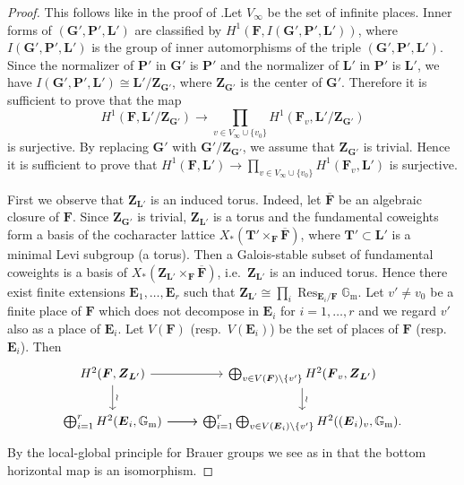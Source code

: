 \documentclass[a4paper]{amsart}
\numberwithin{equation}{section}
\theoremstyle{remark}
\theoremstyle{definition}
\DeclareMathOperator{\Res}{Res}
\newcommand{\glob}[1]{\boldsymbol{#1}}
\renewcommand{\simeq}{\cong}
\begin{document}
\begin{proof}
This follows like in the proof of \cite[Lemma~3.2]{MR3861809}.Let $V_{\infty}$ be the set of infinite places.
Inner forms of $(\glob{G}',\glob{P}',\glob{L}')$ are classified by $H^{1}(\glob{F},I(\glob{G}',\glob{P}',\glob{L}'))$, where $I(\glob{G}',\glob{P}',\glob{L}')$ is the group of inner automorphisms of the triple $(\glob{G}',\glob{P}',\glob{L}')$.
Since the normalizer of $\glob{P}'$ in $\glob{G}'$ is $\glob{P}'$ and the normalizer of $\glob{L}'$ in $\glob{P}'$ is $\glob{L}'$, we have $I(\glob{G}',\glob{P}',\glob{L}')\simeq \glob{L}'/\glob{Z}_{\glob{G}'}$, where $\glob{Z}_{\glob{G}'}$ is the center of $\glob{G}'$.
Therefore it is sufficient to prove that the map
\begin{equation}\label{eq:Galois cohomology lemma, want to prove}
H^{1}(\glob{F},\glob{L}'/\glob{Z}_{\glob{G}'})\to \prod_{v\in V_{\infty}\cup\{v_{0}\}}H^{1}(\glob{F}_{v},\glob{L}'/\glob{Z}_{\glob{G}'})
\end{equation}
is surjective.
By replacing $\glob{G}'$ with $\glob{G}'/\glob{Z}_{\glob{G}'}$, we assume that $\glob{Z}_{\glob{G}'}$ is trivial.
Hence it is sufficient to prove that $H^{1}(\glob{F},\glob{L}')\to \prod_{v\in V_{\infty}\cup\{v_{0}\}}H^{1}(\glob{F}_{v},\glob{L}')$ is surjective.

First we observe that $\glob{Z}_{\glob{L}'}$ is an induced torus.
Indeed, let $\overline{\glob{F}}$ be an algebraic closure of $\glob{F}$.
Since $\glob{Z}_{\glob{G}'}$ is trivial, $\glob{Z}_{\glob{L}'}$ is a torus and the fundamental coweights form a basis of the cocharacter lattice $X_{*}(\glob{T}'\times_{\glob{F}}\overline{\glob{F}})$, where $\glob{T}'\subset \glob{L}'$ is a minimal Levi subgroup (a torus).
Then a Galois-stable subset of fundamental coweights is a basis of $X_{*}(\glob{Z}_{\glob{L}'}\times_{\glob{F}}\overline{\glob{F}})$,
i.e.\ $\glob{Z}_{\glob{L}'}$ is an induced torus.
Hence there exist finite extensions $\glob{E}_{1},\ldots,\glob{E}_{r}$ such that $\glob{Z}_{\glob{L}'}\simeq \prod_i \Res_{\glob{E}_{i}/\glob{F}}\mathbb{G}_{\mathrm{m}}$.
Let $v'\ne v_{0}$ be a finite place of $\glob{F}$ which does not decompose in $\glob{E}_{i}$ for $i = 1,\ldots,r$ and we regard $v'$ also as a place of $\glob{E}_{i}$.
Let $V(\glob{F})$ (resp.\ $V(\glob{E}_{i})$) be the set of places of $\glob{F}$ (resp.\ $\glob{E}_{i}$).
Then 
\[
\begin{tikzcd}
H^{2}(\glob{F},\glob{Z}_{\glob{L}'})\arrow[r]\arrow[d,"\wr"] & \bigoplus_{v\in V(\glob{F})\setminus\{v'\}}H^{2}(\glob{F}_{v},\glob{Z}_{\glob{L}'})\arrow[d,"\wr"]\\
\bigoplus_{i = 1}^{r}H^{2}(\glob{E}_{i},\mathbb{G}_{\mathrm{m}}) \arrow[r]\arrow[r] 
& \bigoplus_{i = 1}^{r}\bigoplus_{v\in V(\glob{E}_{i})\setminus\{v'\}}H^{2}((\glob{E}_{i})_{v},\mathbb{G}_{\mathrm{m}}).
\end{tikzcd}
\]
By the local-global principle for Brauer groups we see as in \cite[Lemma~3]{MR2271021} that the bottom horizontal map is an isomorphism.


\end{proof}
\end{document}
